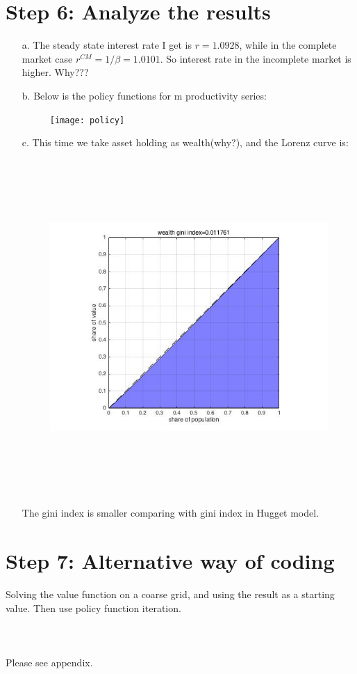 \documentclass[12pt]{article}
\begin{document}
\section{Step 6: Analyze the results}
\begin{enumerate}


	\item [a.] The steady state interest rate I get is $r=1.0928$, while in the complete market case $r^{CM}=1/\beta=1.0101$. So interest rate in the incomplete market is higher. Why???
    \item [b.] Below is the policy functions for m productivity series:
    \begin{figure}[!h]\centering
	\texttt{[image: policy]}
    \end{figure}
    \item [c.]This time we take asset holding as wealth(why?), and the Lorenz curve is:
    \begin{figure}[!h]\centering
    	\includegraphics[width=5in,height=5in]{wgini}
    \end{figure}
    \newline The gini index is smaller comparing with gini index in Hugget model.
\end{enumerate}
\section{Step 7: Alternative way of coding}
Solving the value function on a coarse grid, and using the result as a starting value. Then use policy function iteration.\\\\
\\\\
Please see appendix.
\end{document}
